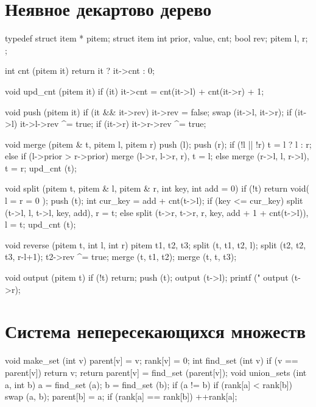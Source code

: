 \documentclass[12pt, titlepage]{article}
\begin{document}
\section{Неявное декартово дерево}
\begin{cppcode}
typedef struct item * pitem;
struct item {
    int prior, value, cnt;
    bool rev;
    pitem l, r;
};

int cnt (pitem it) {
    return it ? it->cnt : 0;
}

void upd_cnt (pitem it) {
    if (it)
        it->cnt = cnt(it->l) + cnt(it->r) + 1;
}

void push (pitem it) {
    if (it && it->rev) {
        it->rev = false;
        swap (it->l, it->r);
        if (it->l)  it->l->rev ^= true;
        if (it->r)  it->r->rev ^= true;
    }
}

void merge (pitem & t, pitem l, pitem r) {
    push (l);
    push (r);
    if (!l || !r)
        t = l ? l : r;
    else if (l->prior > r->prior)
        merge (l->r, l->r, r),  t = l;
    else
        merge (r->l, l, r->l),  t = r;
    upd_cnt (t);
}

void split (pitem t, pitem & l, pitem & r, int key, int add = 0) {
    if (!t)
        return void( l = r = 0 );
    push (t);
    int cur_key = add + cnt(t->l);
    if (key <= cur_key)
        split (t->l, l, t->l, key, add),  r = t;
    else
        split (t->r, t->r, r, key, add + 1 + cnt(t->l)),  l = t;
    upd_cnt (t);
}

void reverse (pitem t, int l, int r) {
    pitem t1, t2, t3;
    split (t, t1, t2, l);
    split (t2, t2, t3, r-l+1);
    t2->rev ^= true;
    merge (t, t1, t2);
    merge (t, t, t3);
}

void output (pitem t) {
    if (!t)  return;
    push (t);
    output (t->l);
    printf ("%
    output (t->r);
}
\end{cppcode}

\section{Система непересекающихся множеств}
\begin{cppcode}
void make_set (int v) {
    parent[v] = v;
    rank[v] = 0;
}
int find_set (int v) {
    if (v == parent[v])
        return v;
    return parent[v] = find_set (parent[v]);
}
void union_sets (int a, int b) {
    a = find_set (a);
    b = find_set (b);
    if (a != b) {
        if (rank[a] < rank[b])
            swap (a, b);
        parent[b] = a;
        if (rank[a] == rank[b])
            ++rank[a];
    }
}
\end{cppcode}
\end{document}

